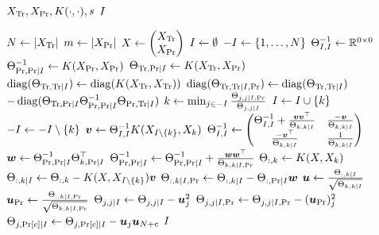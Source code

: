 \begin{algorithmic}[1]
  \REQUIRE \( X_{\text{Tr}}, X_{\text{Pr}}, K(\cdot, \cdot), s \)
  \ENSURE \( I \)

  \STATE \( N \gets \lvert X_{\text{Tr}}\rvert \)
  \STATE \( m \gets \lvert X_{\text{Pr}}\rvert \)
  \STATE \(
    X \gets
    \begin{pmatrix}
      X_{\text{Tr}} \\
      X_{\text{Pr}}
    \end{pmatrix}
  \)
  \STATE \( I \gets \emptyset \)
  \STATE \( -I \gets \{ 1, \dotsc, N \} \)
  \STATE \( \Theta_{I, I}^{-1} \gets \mathbb{R}^{0 \times 0} \)
  \STATE \(
    \Theta_{\text{Pr}, \text{Pr} \mid I}^{-1} \gets
    K(X_{\text{Pr}}, X_{\text{Pr}})
  \)
  \STATE \(
    \Theta_{\text{Tr}, \text{Pr} \mid I} \gets
    K(X_{\text{Tr}}, X_{\text{Pr}})
  \)
  \STATE \(
    \operatorname{diag}(\Theta_{\text{Tr}, \text{Tr} \mid I}) \gets
    \operatorname{diag}(K(X_{\text{Tr}}, X_{\text{Tr}}))
  \)
  \STATE \(
    \operatorname{diag}(\Theta_{\text{Tr}, \text{Tr} \mid I, \text{Pr}}) \gets
    \operatorname{diag}(\Theta_{\text{Tr}, \text{Tr} \mid I})
  \) \\  \(
    - \operatorname{diag}(
      \Theta_{\text{Tr}, \text{Pr} \mid I}
      \Theta_{\text{Pr}, \text{Pr} \mid I}^{-1}
      \Theta_{\text{Pr}, \text{Tr} \mid I}
    )
  \)
    \STATE \(
      k \gets \min_{j \in -I}
      \frac{\Theta_{j, j \mid I, \text{Pr}}}{\Theta_{j, j \mid I}}
    \)
    \STATE \( I \gets I \cup \{ k \} \)
    \STATE \( -I \gets -I \setminus \{ k \} \)
    \STATE \( \bm{v} \gets \Theta_{I, I}^{-1}
      K(X_{I \setminus \{ k \}}, X_k) \)
    \STATE \(
      \Theta_{I, I}^{-1} \gets
      \begin{pmatrix}
        \Theta_{I, I}^{-1} +
        \frac{\bm{v} \bm{v}^{\top}}{\Theta_{k, k \mid I}} &
        \frac{-\bm{v}}{\Theta_{k, k \mid I}} \\
        \frac{-\bm{v}^{\top}}{\Theta_{k, k \mid I}} &
        \frac{1}{\Theta_{k, k \mid I}}
      \end{pmatrix}
    \)
    \STATE \(
      \bm{w} \gets \Theta_{\text{Pr}, \text{Pr} \mid I}^{-1}
      \Theta_{k, \text{Pr} \mid I}^{\top}
    \)
    \STATE \(
      \Theta_{\text{Pr}, \text{Pr} \mid I}^{-1} \gets
      \Theta_{\text{Pr}, \text{Pr} \mid I}^{-1} +
      \frac{\bm{w} \bm{w}^{\top}}{\Theta_{k, k \mid I, \text{Pr}}}
    \)
    \STATE \( \Theta_{:, k} \gets K(X, X_k) \)
    \STATE \(
      \Theta_{:, k \mid I} \gets
      \Theta_{:, k} -
      K(X, X_{I \setminus \{ k \}}) \bm{v}
    \)
    \STATE \(
      \Theta_{:, k \mid I, \text{Pr}} \gets
      \Theta_{:, k \mid I} -
      \Theta_{:, \text{Pr} \mid I} \bm{w}
    \)
    \STATE \(
      \bm{u} \gets
      \frac{\Theta_{:, k \mid I}}{\sqrt{\Theta_{k, k \mid I}}}
    \)
    \STATE \(
      \bm{u}_{\text{Pr}} \gets
      \frac{\Theta_{:, k \mid I, \text{Pr}}}
            {\sqrt{\Theta_{k, k \mid I, \text{Pr}}}}
    \)
      \STATE \(
        \Theta_{j, j \mid I} \gets
        \Theta_{j, j \mid I} -
        \bm{u}_j^2
      \)
      \STATE \(
        \Theta_{j, j \mid I, \text{Pr}} \gets
        \Theta_{j, j \mid I, \text{Pr}} -
        (\bm{u}_{\text{Pr}})_j^2
      \)
        \STATE \(
          \Theta_{j, \text{Pr}[c] \mid I} \gets
          \Theta_{j, \text{Pr}[c] \mid I} -
          \bm{u}_j \bm{u}_{N + c}
        \)
      \ENDFOR
    \ENDFOR
  \ENDWHILE
  \RETURN \( I \)
\end{algorithmic}
